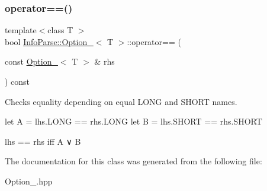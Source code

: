 \subsubsection{\texorpdfstring{operator==()}{operator==()}}
{\footnotesize\ttfamily template$<$class T $>$ \\
bool \mbox{\hyperlink{class_info_parse_1_1_option__}{Info\+Parse\+::\+Option\+\_\+}}$<$ T $>$\+::operator== (\begin{DoxyParamCaption}
                                                                                                                 \item[{const \mbox{\hyperlink{class_info_parse_1_1_option__}{Option\+\_\+}}$<$ T $>$ \&}]{rhs }
\end{DoxyParamCaption}) const}



Checks equality depending on equal L\+O\+NG and S\+H\+O\+RT names.

let A = lhs.\+L\+O\+NG == rhs.\+L\+O\+NG let B = lhs.\+S\+H\+O\+RT == rhs.\+S\+H\+O\+RT

lhs == rhs iff A ∨ B

The documentation for this class was generated from the following file\+:\begin{DoxyCompactItemize}
                                                                             \item
                                                                             Option\+\_\+.\+hpp
\end{DoxyCompactItemize}

